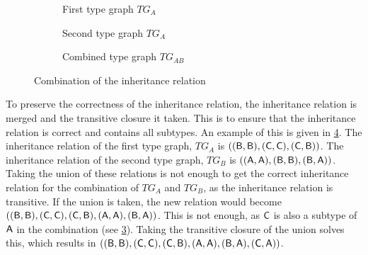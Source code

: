 \begin{figure}
    \centering
    \begin{subfigure}{0.3\textwidth}
        \centering
        
        \caption{First type graph $TG_A$}
        \label{fig:transformation_framework:type_models_and_type_graphs:combining_type_graphs:combine_inh_tg1}
    \end{subfigure}
    \begin{subfigure}{0.3\textwidth}
        \centering
        
        \caption{Second type graph $TG_A$}
        \label{fig:transformation_framework:type_models_and_type_graphs:combining_type_graphs:combine_inh_tg2}
    \end{subfigure}
    \begin{subfigure}{0.3\textwidth}
        \centering
        
        \caption{Combined type graph $TG_{AB}$}
        \label{fig:transformation_framework:type_models_and_type_graphs:combining_type_graphs:combine_inh_tg12}
    \end{subfigure}
    \caption{Combination of the inheritance relation}
    \label{fig:transformation_framework:type_models_and_type_graphs:combining_type_graphs:combine_inh}
\end{figure}

To preserve the correctness of the inheritance relation, the inheritance relation is merged and the transitive closure it taken. This is to ensure that the inheritance relation is correct and contains all subtypes. An example of this is given in \cref{fig:transformation_framework:type_models_and_type_graphs:combining_type_graphs:combine_inh}. The inheritance relation of the first type graph, $TG_A$ is $(( \mathsf{B}, \mathsf{B} ), ( \mathsf{C}, \mathsf{C} ), ( \mathsf{C}, \mathsf{B} ))$. The inheritance relation of the second type graph, $TG_B$ is $(( \mathsf{A}, \mathsf{A} ), ( \mathsf{B}, \mathsf{B} ), ( \mathsf{B}, \mathsf{A} ))$. Taking the union of these relations is not enough to get the correct inheritance relation for the combination of $TG_A$ and $TG_B$, as the inheritance relation is transitive. If the union is taken, the new relation would become $(( \mathsf{B}, \mathsf{B} ), ( \mathsf{C}, \mathsf{C} ), ( \mathsf{C}, \mathsf{B} ), ( \mathsf{A}, \mathsf{A} ), ( \mathsf{B}, \mathsf{A} ))$. This is not enough, as $\mathsf{C}$ is also a subtype of $\mathsf{A}$ in the combination (see \cref{fig:transformation_framework:type_models_and_type_graphs:combining_type_graphs:combine_inh_tg12}). Taking the transitive closure of the union solves this, which results in $(( \mathsf{B}, \mathsf{B} ), ( \mathsf{C}, \mathsf{C} ), ( \mathsf{C}, \mathsf{B} ), ( \mathsf{A}, \mathsf{A} ), ( \mathsf{B}, \mathsf{A} ), ( \mathsf{C}, \mathsf{A} ))$.

